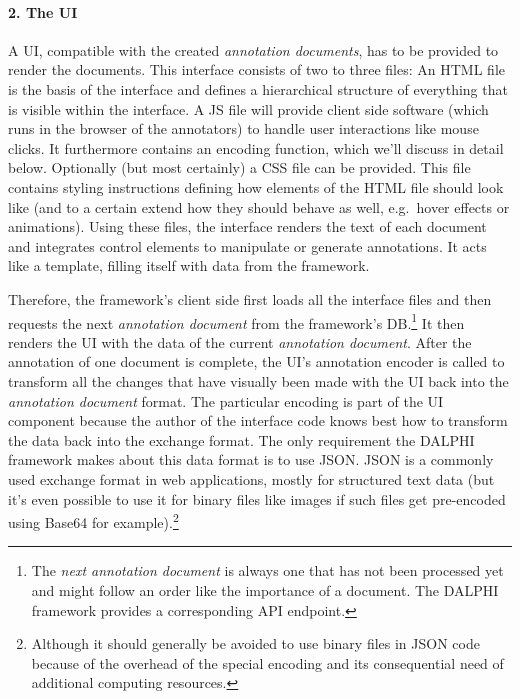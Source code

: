 		\paragraph{2. The \acl{UI}}
		A \ac{UI}, compatible with the created \textit{annotation documents}, has to be provided to render the documents. This interface consists of two to three files: An \ac{HTML} file is the basis of the interface and defines a hierarchical structure of everything that is visible within the interface. A \ac{JS} file will provide client side software (which runs in the browser of the annotators) to handle user interactions like mouse clicks. It furthermore contains an encoding function, which we'll discuss in detail below. Optionally (but most certainly) a \ac{CSS} file can be provided. This file contains styling instructions defining how elements of the \ac{HTML} file should look like (and to a certain extend how they should behave as well, e.g.~hover effects or animations). Using these files, the interface renders the text of each document and integrates control elements to manipulate or generate annotations. It acts like a template, filling itself with data from the framework.

		Therefore, the framework's client side first loads all the interface files and then requests the next \textit{annotation document} from the framework's \ac{DB}.\footnote{The \textit{next annotation document} is always one that has not been processed yet and might follow an order like the importance of a document. The \ac{DALPHI} framework provides a corresponding \acs{API} endpoint.}
		It then renders the \ac{UI} with the data of the current \textit{annotation document}. After the annotation of one document is complete, the \ac{UI}'s annotation encoder is called to transform all the changes that have visually been made with the \ac{UI} back into the \textit{annotation document} format. The particular encoding is part of the \ac{UI} component because the author of the interface code knows best how to transform the data back into the exchange format. The only requirement the \ac{DALPHI} framework makes about this data format is to use \ac{JSON}. \ac{JSON} is a commonly used exchange format in web applications, mostly for structured text data (but it's even possible to use it for binary files like images if such files get pre-encoded using Base64 for example).\footnote{Although it should generally be avoided to use binary files in \ac{JSON} code because of the overhead of the special encoding and its consequential need of additional computing resources.}

